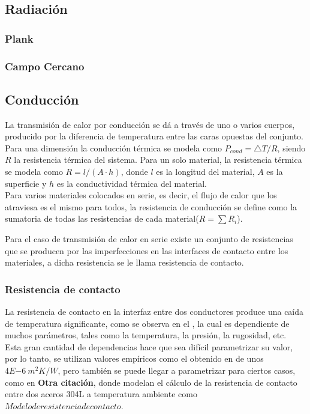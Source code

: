 \subsection{Radiación}

\subsubsection{Plank}
\subsubsection{Campo Cercano}
\subsection{Conducción}
La transmisión de calor por conducción se dá a través de uno o varios cuerpos, producido por la diferencia de temperatura entre las caras opuestas del conjunto. Para una dimensión la conducción térmica se modela como $P_{cond}={\bigtriangleup T}/{R} $, siendo $R$ la resistencia térmica del sistema.
Para un solo material, la resistencia térmica se modela como $R = l/{\left(A\cdot h\right)}$, donde $l$ es la longitud del material, $A$ es la superficie y $h$ es la conductividad térmica del material.\\

Para varios materiales colocados en serie, es decir, el flujo de calor que los atraviesa es el mismo para todos, la resistencia de conducción se define como la sumatoria de todas las resistencias de cada material($R=\sum R_i$).

Para el caso de transmisión de calor en serie existe un conjunto de resistencias que se producen por las imperfecciones en las interfaces de contacto entre los materiales, a dicha resistencia se le llama resistencia de contacto.


\subsubsection{Resistencia de contacto}
La resistencia de contacto en la interfaz entre dos conductores produce una caída de temperatura significante, como se observa en el \cite{noauthor_parallel-plate_nodate}, la cual es dependiente de muchos parámetros, tales como la temperatura, la presión, la rugosidad, etc.\\

Esta gran cantidad de dependencias hace que sea difícil parametrizar su valor, por lo tanto, se utilizan valores empíricos como el obtenido en \cite{noauthor_parallel-plate_nodate} de unos $4E{-6} \ m^2K/W$, pero también se puede llegar a parametrizar para ciertos casos, como en \textbf{Otra citación}, donde modelan el cálculo de la resistencia de contacto entre dos aceros 304L a temperatura ambiente como $Modelo de resistencia de contacto$.